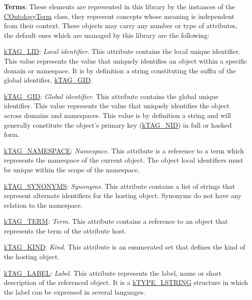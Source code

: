 {\itshape 
\begin{DoxyItemize}
\item {\bfseries Terms}\-: These elements are represented in this library by the instances of the \hyperlink{class_c_ontology_term}{C\-Ontology\-Term} class, they represent concepts whose meaning is independent from their context. These objects may carry any number or type of attributes, the default ones which are managed by this library are the following\-: 
\begin{DoxyItemize}
\item {\ttfamily \hyperlink{}{k\-T\-A\-G\-\_\-\-L\-I\-D}}\-: {\itshape Local identifier}. This attribute contains the local unique identifier. This value represents the value that uniquely identifies an object within a specific domain or namespace. It is by definition a string constituting the suffix of the global identifier, \hyperlink{}{k\-T\-A\-G\-\_\-\-G\-I\-D}. 
\item {\ttfamily \hyperlink{}{k\-T\-A\-G\-\_\-\-G\-I\-D}}\-: {\itshape Global identifier}. This attribute contains the global unique identifier. This value represents the value that uniquely identifies the object across domains and namespaces. This value is by definition a string and will generally constitute the object's primary key (\hyperlink{}{k\-T\-A\-G\-\_\-\-N\-I\-D}) in full or hashed form. 
\item {\ttfamily \hyperlink{}{k\-T\-A\-G\-\_\-\-N\-A\-M\-E\-S\-P\-A\-C\-E}}\-: {\itshape Namespace}. This attribute is a reference to a term which represents the namespace of the current object. The object local identifiers must be unique within the scope of the namespace. 
\item {\ttfamily \hyperlink{}{k\-T\-A\-G\-\_\-\-S\-Y\-N\-O\-N\-Y\-M\-S}}\-: {\itshape Synonyms}. This attribute contains a list of strings that represent alternate identifiers for the hosting object. Synonyms do not have any relation to the namespace. 
\item {\ttfamily \hyperlink{}{k\-T\-A\-G\-\_\-\-T\-E\-R\-M}}\-: {\itshape Term}. This attribute contains a reference to an object that represents the term of the attribute host. 
\item {\ttfamily \hyperlink{}{k\-T\-A\-G\-\_\-\-K\-I\-N\-D}}\-: {\itshape Kind}. This attribute is an enumerated set that defines the kind of the hosting object. 
\item {\ttfamily \hyperlink{}{k\-T\-A\-G\-\_\-\-L\-A\-B\-E\-L}}\-: {\itshape Label}. This attribute represents the label, name or short description of the referenced object. It is a \hyperlink{}{k\-T\-Y\-P\-E\-\_\-\-L\-S\-T\-R\-I\-N\-G} structure in which the label can be expressed in several languages. 

\end{DoxyItemize}
\end{DoxyItemize}}
